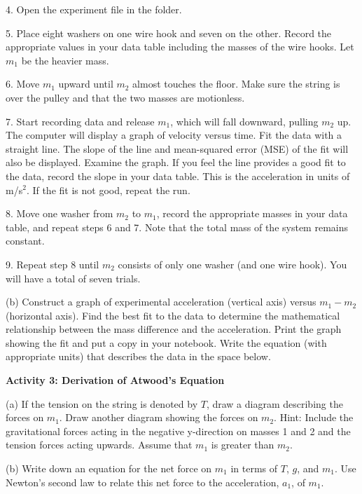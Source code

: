 4. Open the experiment file  in the  \filename{\coursefolder} folder.

5. Place eight washers on one wire hook and seven on the other. Record the appropriate
values in your data table including the masses of the wire hooks. Let \( m_{1} \)
be the heavier mass. 

6. Move \( m_{1} \) upward until \( m_{2} \) almost touches the floor. Make
sure the string is over the pulley and that the two masses are motionless. 

7. Start recording data and release \( m_{1} \), which will fall downward,
pulling \( m_{2} \) up. The computer will display a graph of velocity versus
time. Fit the data with a straight line. The slope of the line and mean-squared
error (MSE) of the fit will also be displayed. Examine the graph. If you feel
the line provides a good fit to the data, record the slope in your data table.
This is the acceleration in units of m/s\( ^{2} \). If the fit is not good,
repeat the run. 

8. Move one washer from \( m_{2} \) to \( m_{1} \), record the appropriate
masses in your data table, and repeat steps 6 and 7. Note that the total mass
of the system remains constant. 

9. Repeat step 8 until \( m_{2} \) consists of only one washer (and one wire
hook). You will have a total of seven trials.

(b) Construct a graph of experimental acceleration (vertical axis) versus \( m_{1}  - m_{2} \) (horizontal axis). Find the best fit to the data to determine the mathematical relationship between the mass difference and the acceleration. Print the graph showing the fit and put a copy in your notebook. Write the equation (with appropriate units) that describes the data in the space below.
\answerspace{20mm}

\pagebreak[3]
\textbf{Activity 3: Derivation of Atwood's Equation }

(a) If the tension on the string is denoted by $T$, draw a diagram describing
the forces on \( m_{1} \). Draw another diagram showing the forces on \( m_{2} \).
Hint: Include the gravitational forces acting in the negative y-direction on
masses 1 and 2 and the tension forces acting upwards. Assume that \( m_{1} \)
is greater than \( m_{2} \).
\vspace{20mm}

(b) Write down an equation for the net force on \( m_{1} \) in terms of $T$, $g$, and \( m_{1} \). Use Newton's second law to relate this net force to the acceleration, \( a_{1} \), of \( m_{1} \).
\vspace{20mm}

